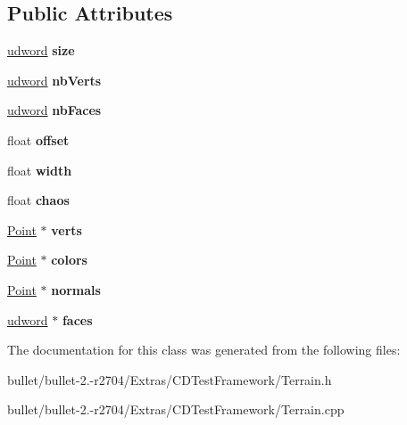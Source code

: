 \subsection*{Public Attributes}
\begin{DoxyCompactItemize}
\item 
\hypertarget{class_terrain_data_a5928bd23550a22915985fc0279762af3}{\hyperlink{_ice_types_8h_a44c6f1920ba5551225fb534f9d1a1733}{udword} {\bfseries size}}\label{class_terrain_data_a5928bd23550a22915985fc0279762af3}

\item 
\hypertarget{class_terrain_data_aa466644d4a401a840cc6e45c024de29b}{\hyperlink{_ice_types_8h_a44c6f1920ba5551225fb534f9d1a1733}{udword} {\bfseries nb\+Verts}}\label{class_terrain_data_aa466644d4a401a840cc6e45c024de29b}

\item 
\hypertarget{class_terrain_data_a47ed57e13c39cc7c4919d1dcd3c5816c}{\hyperlink{_ice_types_8h_a44c6f1920ba5551225fb534f9d1a1733}{udword} {\bfseries nb\+Faces}}\label{class_terrain_data_a47ed57e13c39cc7c4919d1dcd3c5816c}

\item 
\hypertarget{class_terrain_data_a3b6c90ade2bec20a15de3296dcfa2270}{float {\bfseries offset}}\label{class_terrain_data_a3b6c90ade2bec20a15de3296dcfa2270}

\item 
\hypertarget{class_terrain_data_a8f1708269a5e9974e8d997c350a7571a}{float {\bfseries width}}\label{class_terrain_data_a8f1708269a5e9974e8d997c350a7571a}

\item 
\hypertarget{class_terrain_data_ab598eb1a53ba76518a00d14e897fddf1}{float {\bfseries chaos}}\label{class_terrain_data_ab598eb1a53ba76518a00d14e897fddf1}

\item 
\hypertarget{class_terrain_data_a25711efdc00aefe8cc808fff636ee46e}{\hyperlink{class_point}{Point} $\ast$ {\bfseries verts}}\label{class_terrain_data_a25711efdc00aefe8cc808fff636ee46e}

\item 
\hypertarget{class_terrain_data_a464279d1bf7ed812cb2cb5541c02ba86}{\hyperlink{class_point}{Point} $\ast$ {\bfseries colors}}\label{class_terrain_data_a464279d1bf7ed812cb2cb5541c02ba86}

\item 
\hypertarget{class_terrain_data_a1ce8ff6b3f24e42a7d1f534ab7da2b50}{\hyperlink{class_point}{Point} $\ast$ {\bfseries normals}}\label{class_terrain_data_a1ce8ff6b3f24e42a7d1f534ab7da2b50}

\item 
\hypertarget{class_terrain_data_ae6b82c510927923dcc4672bca10be6d6}{\hyperlink{_ice_types_8h_a44c6f1920ba5551225fb534f9d1a1733}{udword} $\ast$ {\bfseries faces}}\label{class_terrain_data_ae6b82c510927923dcc4672bca10be6d6}

\end{DoxyCompactItemize}


The documentation for this class was generated from the following files\+:\begin{DoxyCompactItemize}
\item 
bullet/bullet-\/2.-\/r2704/\+Extras/\+C\+D\+Test\+Framework/Terrain.\+h\item 
bullet/bullet-\/2.-\/r2704/\+Extras/\+C\+D\+Test\+Framework/Terrain.\+cpp\end{DoxyCompactItemize}
